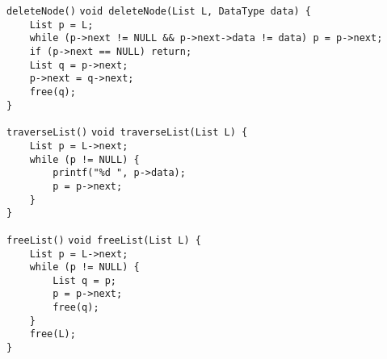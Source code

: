 \documentclass{beamer}
\begin{document}
\begin{frame}{\texttt{deleteNode()}}
    \texttt{void deleteNode(List L, DataType data) \{} \\
    \texttt{\ \ \ \ List p = L;} \\
    \texttt{\ \ \ \ while (p->next != NULL \&\& p->next->data != data) p = p->next;} \\
    \texttt{\ \ \ \ if (p->next == NULL) return;} \\
    \texttt{\ \ \ \ List q = p->next;} \\
    \texttt{\ \ \ \ p->next = q->next;} \\
    \texttt{\ \ \ \ free(q);} \\
    \texttt{\}} \\

\end{frame}

\begin{frame}{\texttt{traverseList()}}
    \texttt{void traverseList(List L) \{} \\
    \texttt{\ \ \ \ List p = L->next;} \\
    \texttt{\ \ \ \ while (p != NULL) \{} \\
    \texttt{\ \ \ \ \ \ \ \ printf("\%d ", p->data);} \\
    \texttt{\ \ \ \ \ \ \ \ p = p->next;} \\
    \texttt{\ \ \ \ \}} \\
    \texttt{\}} \\
\end{frame}

\begin{frame}{\texttt{freeList()}}
    \texttt{void freeList(List L) \{} \\
    \texttt{\ \ \ \ List p = L->next;} \\
    \texttt{\ \ \ \ while (p != NULL) \{} \\
    \texttt{\ \ \ \ \ \ \ \ List q = p;} \\
    \texttt{\ \ \ \ \ \ \ \ p = p->next;} \\
    \texttt{\ \ \ \ \ \ \ \ free(q);} \\
    \texttt{\ \ \ \ \}} \\
    \texttt{\ \ \ \ free(L);} \\
    \texttt{\}} \\
\end{frame}
\end{document}
